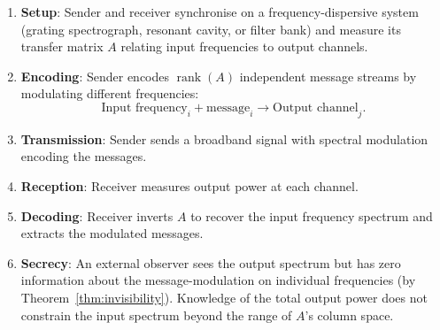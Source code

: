 \documentclass[11pt,twocolumn,a4paper]{article}
\theoremstyle{definition}
\DeclareMathOperator{\rank}{rank}
\begin{document}
\begin{protocol}
\label{prot:spectral}
\begin{enumerate}[nosep]
\item \textbf{Setup}: Sender and receiver synchronise on a frequency-dispersive system (grating spectrograph, resonant cavity, or filter bank) and measure its transfer matrix $A$ relating input frequencies to output channels.

\item \textbf{Encoding}: Sender encodes $\rank(A)$ independent message streams by modulating different frequencies:
\[
\text{Input frequency}_i + \text{message}_i \rightarrow \text{Output channel}_j.
\]

\item \textbf{Transmission}: Sender sends a broadband signal with spectral modulation encoding the messages.

\item \textbf{Reception}: Receiver measures output power at each channel.

\item \textbf{Decoding}: Receiver inverts $A$ to recover the input frequency spectrum and extracts the modulated messages.

\item \textbf{Secrecy}: An external observer sees the output spectrum but has zero information about the message-modulation on individual frequencies (by Theorem~\ref{thm:invisibility}). Knowledge of the total output power does not constrain the input spectrum beyond the range of $A$'s column space.
\end{enumerate}
\end{protocol}
\end{document}
